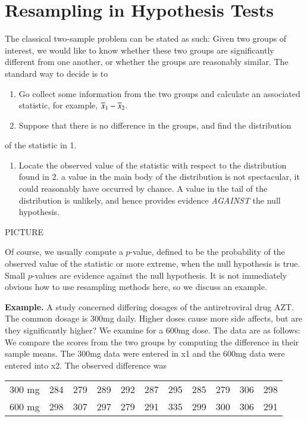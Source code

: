 \documentclass[captions=tableheading]{scrbook}
\begin{document}
\section{Resampling in Hypothesis Tests}
\label{sec-4_4}


The classical two-sample problem can be stated as such: Given two groups of interest, we would like to know whether these two groups are significantly different from one another, or whether the groups are reasonably similar. The standard way to decide is to


\begin{enumerate}
\item Go collect some information from the two groups and calculate an associated statistic, for example, $\overline{x}_{1}-\overline{x}_{2}$.
\item Suppose that there is no difference in the groups, and find the distribution
\end{enumerate}
of the statistic in 1. 


\begin{enumerate}
\item Locate the observed value of the statistic with respect to the distribution found in 2. a value in the main body of the distribution is not spectacular, it could reasonably have occurred by chance. A value in the tail of the distribution is unlikely, and hence provides evidence \emph{AGAINST} the null hypothesis.
\end{enumerate}
PICTURE

\vspace{1in}


Of course, we usually compute a $p$-value, defined to be the probability of the observed value of the statistic or more extreme, when the null hypothesis is true. Small $p$-values are evidence against the null hypothesis. It is not immediately obvious how to use resampling methods here, so we discuss an example.

\textbf{Example.} A study concerned differing dosages of the antiretroviral drug AZT. The common dosage is 300mg daily. Higher doses cause more side affects, but are they significantly higher? We examine for a 600mg dose. The data are as follows: We compare the scores from the two groups by computing the difference in their sample means. The 300mg data were entered in x1 and the 600mg data were entered into x2. The observed difference was

\begin{center}
\begin{tabular}{l|cccccccccc}
300 mg  & 284  & 279  & 289  & 292  & 287  & 295  & 285  & 279  & 306  & 298 \tabularnewline
600 mg  & 298  & 307  & 297  & 279  & 291  & 335  & 299  & 300  & 306  & 291 \tabularnewline
\end{tabular}
\par\end{center}
\end{document}
